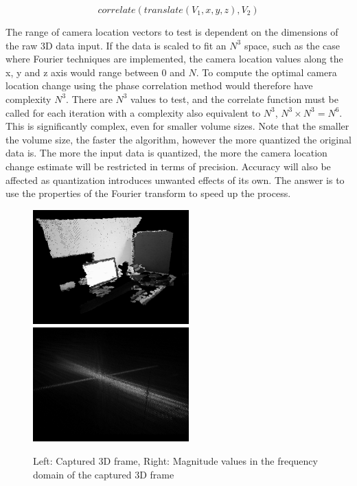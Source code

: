 \begin{equation} \label{eqn:CrossCorrelationEquation11}
correlate(translate(V_1, x,y,z), V_2)
\end{equation}

The range of camera location vectors to test is dependent on the dimensions of the raw 3D data input. If the data is scaled to fit an $N^3$ space, such as the case where Fourier techniques are implemented, the camera location values along the x, y and z axis would range between 0 and $N$. To compute the optimal camera location change using the phase correlation method would therefore have complexity $N^3$. There are $N^3$ values to test, and the correlate function must be called for each iteration with a complexity also equivalent to $N^3$, $N^3 \times N^3 = N^6$. This is significantly complex, even for smaller volume sizes. Note that the smaller the volume size, the faster the algorithm, however the more quantized the original data is. The more the input data is quantized, the more the camera location change estimate will be restricted in terms of precision. Accuracy will also be affected as quantization introduces unwanted effects of its own. The answer is to use the properties of the Fourier transform to speed up the process.  \\

\begin{figure}[!htb]
\centering
\includegraphics[width=6cm]{images/methodology/FVR/capFrameOriginal}
\includegraphics[width=6cm]{images/methodology/FVR/capFrameMagFFT}
\caption{Left: Captured 3D frame, Right: Magnitude values in the frequency domain of the captured 3D frame}
\label{fig:FrequencyDomainExample}
\end{figure}
 
